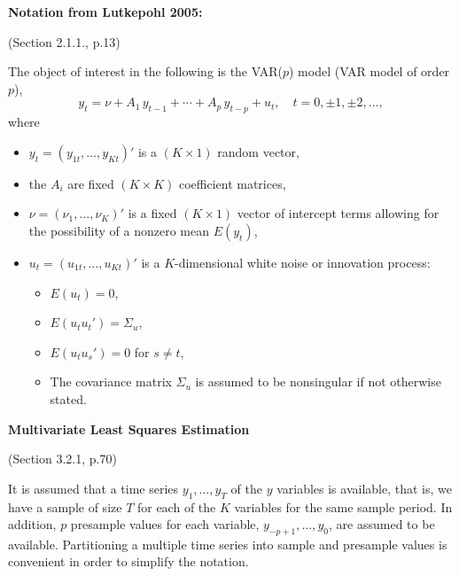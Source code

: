 \documentclass[12pt]{article}
\begin{document}
\textbf{Notation from Lutkepohl 2005:}

(Section 2.1.1., p.13)

The object of interest in the following is the VAR($ p $) model (VAR model of order $ p $),
\[
	y_t = \nu + A_1 \, y_{t-1} + \cdots + A_p \, y_{t-p} + u_t, \quad t = 0, \pm 1, \pm 2, \dots,
\]
where 
\begin{itemize}
	\item $ y_t = (y_{1t}, \dots, y_{Kt})' $ is a $ (K \times 1) $ random vector,
	\item the $ A_i $ are fixed $ (K \times K) $ coefficient matrices,
	\item $ \nu = (\nu_1, \dots , \nu_K)' $ is a fixed $ (K \times 1) $ vector of intercept terms allowing for the possibility of a nonzero mean $ E(y_t) $,
	\item $ u_t = (u_{1t}, \dots, u_{Kt})' $ is a $ K $-dimensional white noise or innovation process: 
	\begin{itemize}
		\item $ E(u_t) = 0 $,
		\item $ E(u_t u_t') = \Sigma_u $,
		\item $ E(u_t u_s') = 0 $ for $ s \neq t $,
		\item The covariance matrix $ \Sigma_u $ is assumed to be nonsingular if not otherwise stated.
	\end{itemize}
\end{itemize}

\clearpage

\textbf{Multivariate Least Squares Estimation}

(Section 3.2.1, p.70)

It is assumed that a time series $ y_1, \dots, y_T $ of the $ y $ variables is available, that is, we have a sample of size $ T $ for each of the $ K $ variables for the same sample period. In addition, $ p $ presample values for each variable, $ y_{-p+1}, \dots, y_0 $, are assumed to be available. Partitioning a multiple time series into sample and presample values is convenient in order to simplify the notation. 
\end{document}
